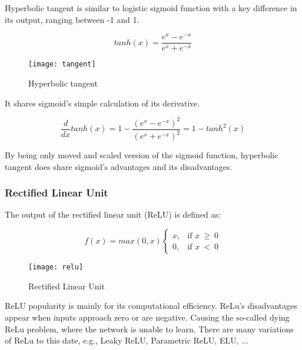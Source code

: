 Hyperbolic tangent is similar to logistic sigmoid function with a key difference in its output, ranging between -1 and 1.

\begin{equation}
    {tanh(x) = \frac{e^x - e^{-x}}{e^x + e^{-x}}}
\end{equation}


\begin{figure}[h]
	\centering
    \texttt{[image: tangent]}
	\caption{Hyperbolic tangent}
	\label{fig:hyperbolictangent}
\end{figure}


It shares sigmoid's simple calculation of its derivative.

\begin{equation}
    {\frac{d}{dx}tanh(x) = 1 - \frac{(e^x - e^{-x})^2}{(e^x + e^{-x})^2} = 1 -tanh^2(x)}
\end{equation}

By being only moved and scaled version of the sigmoid function, hyperbolic tangent does share sigmoid's advantages and its disadvantages.\cite{leskovec2020mining}


\subsubsection{Rectified Linear Unit}

The output of the rectified linear unit (ReLU) is defined as:

\begin{equation}
    f(x) = max(0,x)
\begin{cases}
    x, & \text{if $x\ \geq\ 0$}\\
    0, & \text{if $x\ <\ 0$}
\end{cases} 
\end{equation} 

\begin{figure}[h]
	\centering
    \texttt{[image: relu]}
	\caption{Rectified Linear Unit}
	\label{fig:relu}
\end{figure}


ReLU popularity is mainly for its computational efficiency.\cite{7typesactivationfunctions} ReLu's disadvantages appear when inputs approach zero or are negative. Causing the so-called dying ReLu problem, where the network is unable to learn. There are many variations of ReLu to this date, e.g., Leaky ReLU, Parametric ReLU, ELU, ... 

